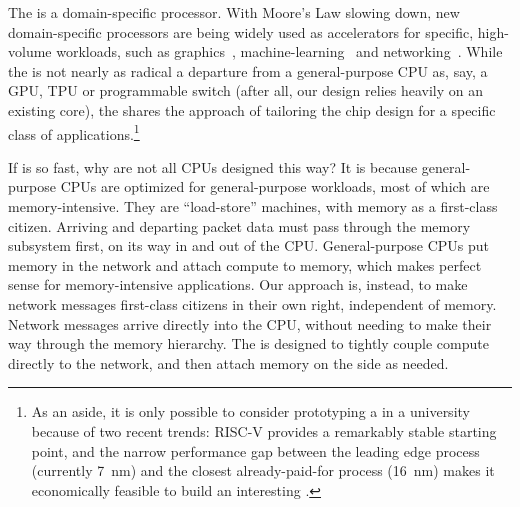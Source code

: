 
The \name{} is a domain-specific processor. 
With Moore's Law slowing down, new domain-specific processors are being widely used as accelerators for specific, high-volume workloads, such as graphics~\cite{nvidia-geforce}, machine-learning~\cite{tensorflow} and networking~\cite{RMT}. 
While the \name{} is not nearly as radical a departure from a general-purpose CPU as, say, a GPU, TPU or programmable switch (after all, our design relies heavily on an existing core), the \name{} shares the approach of tailoring the chip design for a specific class of applications.\footnote{As an aside, it is only possible to consider prototyping a \name{} in a university because of two recent trends: RISC-V provides a remarkably stable starting point, and the narrow performance gap between the leading edge process (currently \SI{7}{nm}) and the closest already-paid-for process (\SI{16}{nm}) makes it economically feasible to build an interesting \name{}.}

If \name{} is so fast, why are not all CPUs designed this way? 
It is because general-purpose CPUs are optimized for general-purpose workloads, most of which are memory-intensive. 
They are ``load-store'' machines, with memory as a first-class citizen. 
Arriving and departing packet data must pass through the memory subsystem first, on its way in and out of the CPU. 
General-purpose CPUs put memory in the network and attach compute to memory, which makes perfect sense for memory-intensive applications.
Our approach is, instead, to make network messages first-class citizens in their own right, independent of memory. 
Network messages arrive directly into the CPU, without needing to make their way through the memory hierarchy. 
The \name{} is designed to tightly couple compute directly to the network, and then attach memory on the side as needed.

